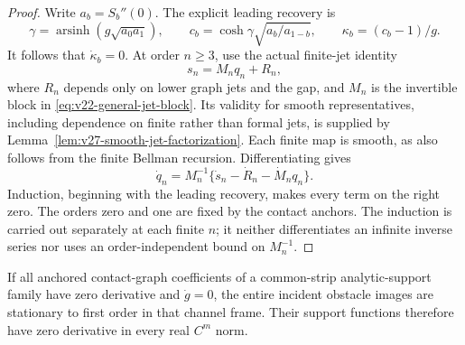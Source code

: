 \begin{proof}
Write $a_b=S_b''(0)$.  The explicit leading recovery is
\[
 \gamma=\operatorname{arsinh}(g\sqrt{a_0a_1}),\qquad
 c_b=\cosh\gamma\sqrt{a_b/a_{1-b}},\qquad
 \kappa_b=(c_b-1)/g.
\]
It follows that $\dot\kappa_b=0$.  At order $n\ge3$, use the actual
finite-jet identity
\[
             s_n=M_nq_n+R_n,
\]
where $R_n$ depends only on lower graph jets and the gap, and $M_n$ is
the invertible block in \eqref{eq:v22-general-jet-block}.  Its validity
for smooth representatives, including dependence on finite rather than
formal jets, is supplied by
Lemma~\ref{lem:v27-smooth-jet-factorization}.  Each finite map is smooth,
as also follows from the finite Bellman recursion.  Differentiating gives
\begin{equation}\label{eq:v48-jet-differential}
       \dot q_n=M_n^{-1}\{\dot s_n-\dot R_n-\dot M_nq_n\}.
\end{equation}
Induction, beginning with the leading recovery, makes every term on
the right zero.  The orders zero and one are fixed by the contact
anchors.  The induction is carried out separately at each finite
$n$; it neither differentiates an infinite inverse series nor uses an
order-independent bound on $M_n^{-1}$.
\end{proof}

\begin{lemma}
\label{lem:v48-analytic-variation}
If all anchored contact-graph coefficients of a common-strip
analytic-support family have zero derivative and $\dot g=0$, the entire
incident obstacle images are stationary to first order in that channel
frame.  Their support functions therefore have zero derivative in every
real $C^m$ norm.
\end{lemma}

